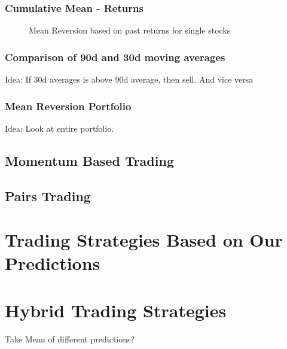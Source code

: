 \subsubsection{Cumulative Mean - Returns}

\begin{figure}
    \centering
    \begin{adjustbox}{width=.7\textwidth,center}
        
    \end{adjustbox}  
    \caption{Mean Reversion based on past returns for single stocks}
    \label{fig:mean_reversion_returns}
\end{figure}{}

\subsubsection{Comparison of 90d and 30d moving averages}
Idea: If 30d averages is above 90d average, then sell. And vice versa

\subsubsection{Mean Reversion Portfolio}
Idea: Look at entire portfolio. 




\subsection{Momentum Based Trading}


\subsection{Pairs Trading}



\section{Trading Strategies Based on Our Predictions}



\section{Hybrid Trading Strategies}
Take Mean of different predictions?


